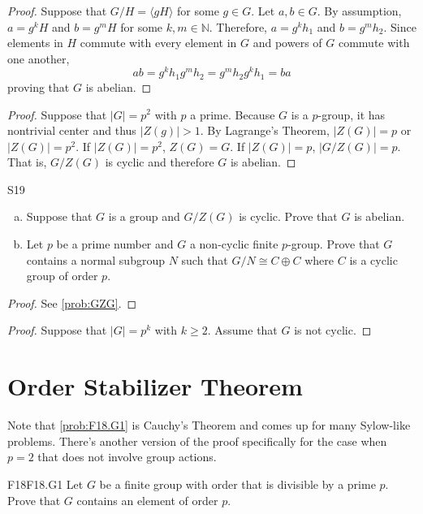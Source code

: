 \documentclass{article}
\newcommand{\N}{\mathbb{N}}
\theoremstyle{definition}
\begin{document}
	\begin{proof}
	Suppose that $G/H = \langle gH \rangle$ for some $g \in G$. Let $a, b \in G$. By assumption, $a = g^kH$ and $b = g^mH$ for some $k,m \in \N$. Therefore, $a = g^kh_1$ and $b= g^m h_2$. Since elements in $H$ commute with every element in $G$ and powers of $G$ commute with one another,
		\[ab = g^kh_1g^mh_2 = g^mh_2g^k h_1 = ba \]
	proving that $G$ is abelian.
	\end{proof}
	
	\begin{proof}
	Suppose that $|G| = p^2$ with $p$ a prime. Because $G$ is a $p$-group, it has nontrivial center and thus $|Z(g)| > 1$. By Lagrange's Theorem, $|Z(G)| = p$ or $|Z(G)| = p^2$. If $|Z(G)| =p^2$, $Z(G) = G$. If $|Z(G)| = p$, $\left|G/Z(G) \right| = p$. That is, $G/Z(G)$ is cyclic and therefore $G$ is abelian.
	\end{proof}
	
	\begin{prob}{S19}{}
	\begin{enumerate}[(a)]
	\item Suppose that $G$ is a group and $G/Z(G)$ is cyclic. Prove  that $G$ is abelian.
	\item Let $p$ be a prime number and $G$ a non-cyclic finite $p$-group. Prove that $G$ contains a normal subgroup $N$ such that $G/N \cong C \oplus C$ where $C$ is a cyclic group of order $p$.
	\end{enumerate}
	\end{prob}
	
	\begin{proof}
	See \ref{prob:GZG}.
	\end{proof}
	
	\begin{proof}
	Suppose that $|G| = p^k$ with $k \geq 2$. Assume that $G$ is not cyclic.
	\end{proof}
	

\section{Order Stabilizer Theorem}

Note that \ref{prob:F18.G1} is Cauchy's Theorem and comes up for many Sylow-like problems. There's another version of the proof specifically for the case when $p = 2$ that does not involve group actions.

	\begin{prob}{F18}{F18.G1}
	Let $G$ be a finite group with order that is divisible by a prime $p$. Prove that $G$ contains an element of order $p$.
	\end{prob}
	
\end{document}
